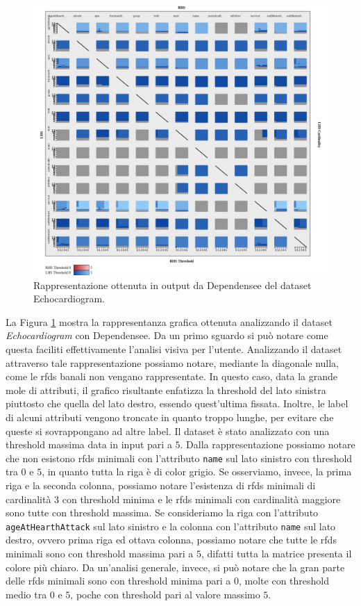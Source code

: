 \begin{figure}[ht]
    \centering
    \includegraphics[width=\linewidth]{capitoli/figure/echocardiogram}
    \caption{Rappresentazione ottenuta in output da Dependensee del dataset Echocardiogram.}
    \label{fig:echocardiogram_result}
\end{figure}
La Figura \ref{fig:echocardiogram_result} mostra la rappresentanza grafica ottenuta analizzando il dataset \textit{Echocardiogram} con Dependensee. Da un primo sguardo si pu\`{o} notare come questa faciliti effettivamente l'analisi visiva per l'utente. Analizzando il dataset attraverso tale rappresentazione possiamo notare, mediante la diagonale nulla, come le \acrlong{rfds} banali non vengano rappresentate. In questo caso, data la grande mole di attributi, il grafico risultante enfatizza la threshold del lato sinistra piuttosto che quella del lato destro, essendo quest'ultima fissata. Inoltre, le label di alcuni attributi vengono troncate in quanto troppo lunghe, per evitare che queste si sovrappongano ad altre label. Il dataset \`{e} stato analizzato con una threshold massima data in input pari a $5$. Dalla rappresentazione possiamo notare che non esistono \acrlong{rfds} minimali con l'attributo \texttt{name} sul lato sinistro con threshold tra $0$ e $5$, in quanto tutta la riga \`{e} di color grigio. Se osserviamo, invece, la prima riga e la seconda colonna, possiamo notare l'esistenza di \acrlong{rfds} minimali di cardinalit\`{a} $3$ con threshold minima e le \acrlong{rfds} minimali con cardinalit\`{a} maggiore sono tutte con threshold massima. Se consideriamo la riga con l'attributo \texttt{ageAtHearthAttack} sul lato sinistro e la colonna con l'attributo \texttt{name} sul lato destro, ovvero prima riga ed ottava colonna, possiamo notare che tutte le \acrlong{rfds} minimali sono con threshold massima pari a $5$, difatti tutta la matrice presenta il colore pi\`{u} chiaro. Da un'analisi generale, invece, si pu\`{o} notare che la gran parte delle \acrlong{rfds} minimali sono con threshold minima pari a $0$, molte con threshold medio tra $0$ e $5$, poche con threshold pari al valore massimo $5$.\par
